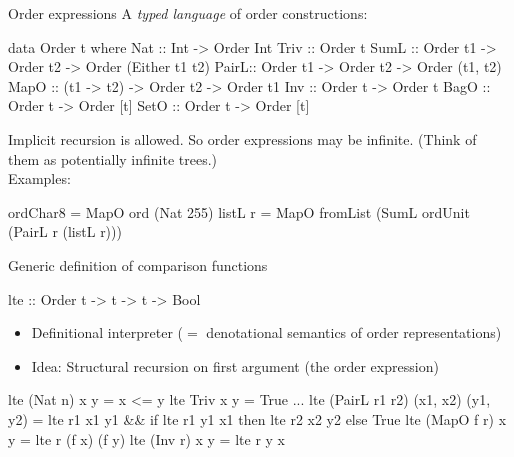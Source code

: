 \documentclass{beamer}
\begin{document}
\begin{frame}[fragile]{Order expressions}
  A \emph{typed language} of order constructions:
\begin{haskell}
data Order t  where
     Nat  ::  Int -> Order Int
     Triv ::  Order t
     SumL ::  Order t1 -> Order t2 -> Order (Either t1 t2)
     PairL::  Order t1 -> Order t2 -> Order (t1, t2)
     MapO ::  (t1 -> t2) -> Order t2 -> Order t1
     Inv  ::  Order t -> Order t
     BagO ::  Order t -> Order [t]
     SetO ::  Order t -> Order [t]
\end{haskell}
  Implicit recursion is allowed. So order expressions may be infinite.
  (Think of them as potentially infinite trees.)\\
  Examples:
\begin{haskell}
ordChar8 = MapO ord (Nat 255)
listL r = MapO fromList
         (SumL ordUnit (PairL r (listL r)))
\end{haskell}
\end{frame}

\begin{frame}[fragile]{Generic definition of comparison functions}
\begin{haskell}
lte :: Order t -> t -> t -> Bool
\end{haskell}
  \begin{itemize}
  \item Definitional interpreter ($=$ denotational semantics of order
    representations)
  \item Idea: Structural recursion on first argument (the order expression)
  \end{itemize}
\begin{haskell}
lte (Nat n) x y  = x <= y
lte Triv    x y  = True
...
lte (PairL r1 r2) (x1, x2) (y1, y2) =
     lte r1 x1 y1 &&
     if lte r1 y1 x1 then lte r2 x2 y2 else True
lte (MapO f r) x y = lte r (f x) (f y)
lte (Inv r) x y = lte r y x
\end{haskell}
\end{frame}
\end{document}
